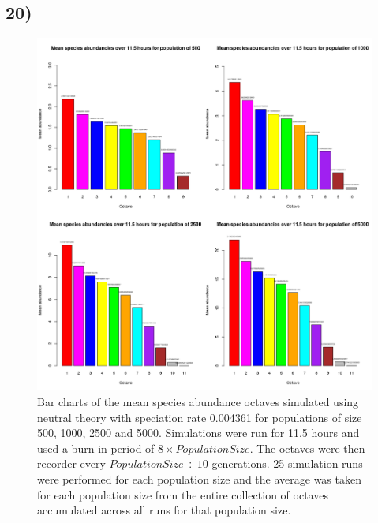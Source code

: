 \documentclass[11pt]{article}
\begin{document}
\subsection*{20)}
\begin{figure}[H]
\begin{center}
\includegraphics[scale=0.48]{../Results/Plots/Question_20.png}
\caption{Bar charts of the mean species abundance octaves simulated using neutral theory with speciation rate 0.004361 for populations of size 500, 1000, 2500 and 5000. Simulations were run for 11.5 hours and used a burn in period of $8\times Population Size$. The octaves were then recorder every $Population Size \div 10$ generations. 25 simulation runs were performed for each population size and the average was taken for each population size from the entire collection of octaves accumulated across all runs for that population size.}
\end{center}
\end{figure} 
\end{document}

